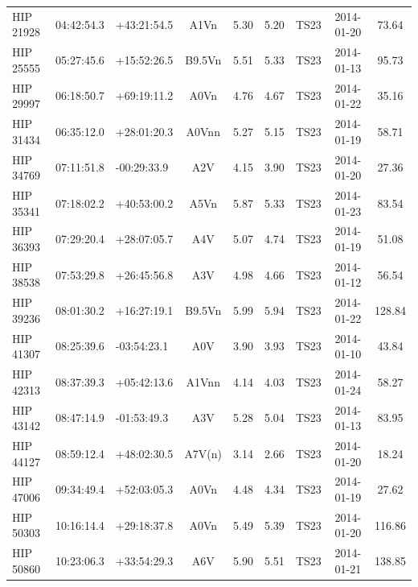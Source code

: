 \begin{scriptsize}
\begin{longtable}{lllcccrcc}
   HIP 21928 &  04:42:54.3 &  +43:21:54.5 &           A1Vn &     5.30 &     5.20 &       TS23 &  2014-01-20 &           73.64 \\
   HIP 25555 &  05:27:45.6 &  +15:52:26.5 &         B9.5Vn &     5.51 &     5.33 &       TS23 &  2014-01-13 &           95.73 \\
   HIP 29997 &  06:18:50.7 &  +69:19:11.2 &           A0Vn &     4.76 &     4.67 &       TS23 &  2014-01-22 &           35.16 \\
   HIP 31434 &  06:35:12.0 &  +28:01:20.3 &          A0Vnn &     5.27 &     5.15 &       TS23 &  2014-01-19 &           58.71 \\
   HIP 34769 &  07:11:51.8 &  -00:29:33.9 &            A2V &     4.15 &     3.90 &       TS23 &  2014-01-20 &           27.36 \\
   HIP 35341 &  07:18:02.2 &  +40:53:00.2 &           A5Vn &     5.87 &     5.33 &       TS23 &  2014-01-23 &           83.54 \\
   HIP 36393 &  07:29:20.4 &  +28:07:05.7 &            A4V &     5.07 &     4.74 &       TS23 &  2014-01-19 &           51.08 \\
   HIP 38538 &  07:53:29.8 &  +26:45:56.8 &            A3V &     4.98 &     4.66 &       TS23 &  2014-01-12 &           56.54 \\
   HIP 39236 &  08:01:30.2 &  +16:27:19.1 &         B9.5Vn &     5.99 &     5.94 &       TS23 &  2014-01-22 &          128.84 \\
   HIP 41307 &  08:25:39.6 &  -03:54:23.1 &            A0V &     3.90 &     3.93 &       TS23 &  2014-01-10 &           43.84 \\
   HIP 42313 &  08:37:39.3 &  +05:42:13.6 &          A1Vnn &     4.14 &     4.03 &       TS23 &  2014-01-24 &           58.27 \\
   HIP 43142 &  08:47:14.9 &  -01:53:49.3 &            A3V &     5.28 &     5.04 &       TS23 &  2014-01-13 &           83.95 \\
   HIP 44127 &  08:59:12.4 &  +48:02:30.5 &         A7V(n) &     3.14 &     2.66 &       TS23 &  2014-01-20 &           18.24 \\
   HIP 47006 &  09:34:49.4 &  +52:03:05.3 &           A0Vn &     4.48 &     4.34 &       TS23 &  2014-01-19 &           27.62 \\
   HIP 50303 &  10:16:14.4 &  +29:18:37.8 &           A0Vn &     5.49 &     5.39 &       TS23 &  2014-01-20 &          116.86 \\
   HIP 50860 &  10:23:06.3 &  +33:54:29.3 &            A6V &     5.90 &     5.51 &       TS23 &  2014-01-21 &          138.85 \\

\end{longtable}
\end{scriptsize}
